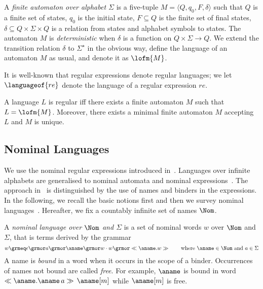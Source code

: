 A \emph{finite automaton over alphabet $\Sigma$} is a five-tuple
$M=\langle Q,q_0,F,\delta\rangle$ such that $Q$ is a finite set of
states, $q_0$ is the initial state, $F\subseteq Q$ is the finite set
of final states, $\delta \subseteq Q\times \Sigma\times Q$ is a
relation from states and alphabet symbols to states.
%
The automaton $M$ is \emph{deterministic} when $\delta$ is a function
on $Q\times\Sigma\rightarrow Q$.
%
We extend the transition relation $\delta$ to $\Sigma^\star$ in the
obvious way, define the language of an automaton $M$ as usual, and
denote it as $\lofm{M}$.

It is well-known that regular expressions denote regular languages; we
let $\languageof{re}$ denote the language of a regular expression
$re$.
%
\begin{theorem}\label{thm:minimal_unique}
  A language $L$ is regular iff there exists a finite automaton $M$
  such that $L=\lofm{M}$.
  Moreover, there exists a minimal finite automaton $M$ accepting $L$
  and $M$ is unique.
\end{theorem}



\subsection{Nominal Languages}\label{st:NL}
We use the nominal regular expressions introduced
in~\cite{Kurz0T2012,Kurz0T13}.
%
Languages over infinite alphabets are generalised to nominal automata
and nominal expressions~\cite{BojanczykKL14,Kurz0T2012,Kurz0T13,SchroderKMW17,segoufin2006}.
%
The approach in~\cite{Kurz0T2012} is distinguished by the use of names
and binders in the expressions.
%
In the following, we recall the basic notions first and then we survey
nominal languages~\cite{Kurz0T2012}.
%
Hereafter, we fix a countably infinite set of names $\Nom$.

A \emph{nominal language over $\Nom$ and $\Sigma$} is a set of nominal
words $w$ over $\Nom$ and $\Sigma$, that is terms derived by the
grammar
\[
  w \grmeq \epsilon \grmor a \grmor \aname \grmor w\cdot w \grmor \ll \aname.w\gg
  \qquad
  \text{where } \aname \in \Nom \text{ and } a \in \Sigma
\]
%
A name is \emph{bound} in a word when it occurs in the scope of a
binder.
%
Occurrences of names not bound are called \emph{free}.
%
For example, $\aname$ is bound in word
$\ll \aname. \aname \, a \gg \, \aname[m]$ while $\aname[m]$ is free.

